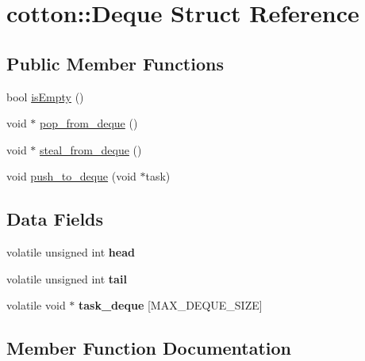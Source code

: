 \hypertarget{structcotton_1_1Deque}{}\section{cotton\+:\+:Deque Struct Reference}
\label{structcotton_1_1Deque}
\subsection*{Public Member Functions}
\begin{DoxyCompactItemize}
\item 
bool \mbox{\hyperlink{structcotton_1_1Deque_aa9786768e53c18c03e6e641e06e075e6}{is\+Empty}} ()
\item 
void $\ast$ \mbox{\hyperlink{structcotton_1_1Deque_a206682dc43f6b981adcf3c10c6696f1b}{pop\+\_\+from\+\_\+deque}} ()
\item 
void $\ast$ \mbox{\hyperlink{structcotton_1_1Deque_a33215b0b811484e2af94f2db16a5c15c}{steal\+\_\+from\+\_\+deque}} ()
\item 
void \mbox{\hyperlink{structcotton_1_1Deque_a482281bb7b1afec18e0f324156c2ad27}{push\+\_\+to\+\_\+deque}} (void $\ast$task)
\end{DoxyCompactItemize}
\subsection*{Data Fields}
\begin{DoxyCompactItemize}
\item 
\mbox{\label{structcotton_1_1Deque_af6b3bcb9724c06b1d44c1b2991cf5527}} 
volatile unsigned int {\bfseries head}
\item 
\mbox{\label{structcotton_1_1Deque_a072396dbfabb1e2de55c15eb352462be}} 
volatile unsigned int {\bfseries tail}
\item 
\mbox{\label{structcotton_1_1Deque_af2d64df8094054fb069ef74c5842df60}} 
volatile void $\ast$ {\bfseries task\+\_\+deque} \mbox{[}M\+A\+X\+\_\+\+D\+E\+Q\+U\+E\+\_\+\+S\+I\+ZE\mbox{]}
\end{DoxyCompactItemize}


\subsection{Member Function Documentation}
\mbox{\label{structcotton_1_1Deque_aa9786768e53c18c03e6e641e06e075e6}} 
